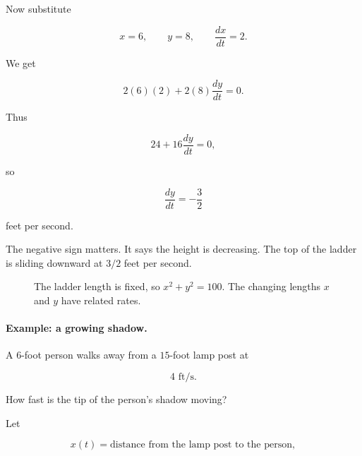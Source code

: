 Now substitute

\[
x=6,\qquad y=8,\qquad \frac{dx}{dt}=2.
\]

We get

\[
2(6)(2)+2(8)\frac{dy}{dt}=0.
\]

Thus

\[
24+16\frac{dy}{dt}=0,
\]

so

\[
\boxed{
\frac{dy}{dt}=-\frac32
}
\]

feet per second.

The negative sign matters.  It says the height is decreasing.  The top of the ladder is
sliding downward at \(3/2\) feet per second.

\begin{figure}[h]
\centering
{}
\caption{The ladder length is fixed, so \(x^2+y^2=100\).  The changing lengths \(x\) and \(y\) have related rates.}
\label{fig:related-rates-ladder}
\end{figure}

\paragraph{Example: a growing shadow.}
A \(6\)-foot person walks away from a \(15\)-foot lamp post at

\[
4\text{ ft/s}.
\]

How fast is the tip of the person's shadow moving?

Let

\[
x(t)=\text{distance from the lamp post to the person},
\]

